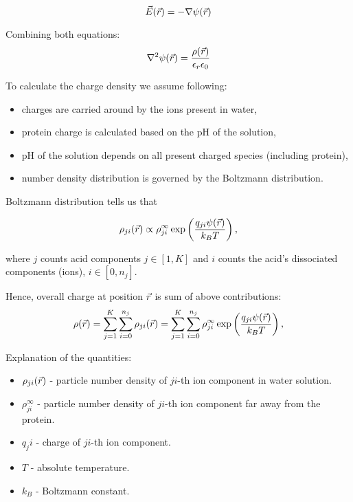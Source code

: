 \begin{equation}
    \vec{E}(\vec{r}) = -\nabla \psi(\vec{r})
\end{equation}

Combining both equations:
\begin{equation}\label{eq:PoissonInMatter1}
    \nabla^2 \psi(\vec{r}) = \frac{\rho(\vec{r})}{\epsilon_r\epsilon_0}
\end{equation}

To calculate the charge density we assume following:
\begin{itemize}
    \item charges are carried around by the ions present in water,
    \item protein charge is calculated based on the pH of the solution,
    \item pH of the solution depends on all present charged species (including protein),
    \item number density distribution is governed by the Boltzmann distribution.
\end{itemize}

Boltzmann distribution tells us that

\begin{equation}
    \rho_{ji}(\vec{r}) \propto \rho_{ji}^{\infty} \exp\left(\frac{q_{ji}\psi(\vec{r})}{k_BT}\right),
\end{equation}

where $j$ counts acid components $j \in [1, K]$ and $i$ counts the acid's dissociated components
(ions), $i \in [0, n_j]$.

Hence, overall charge at position $\vec{r}$ is sum of above contributions:
\begin{equation}\label{eq:BoltzmannDist1}
    \rho(\vec{r}) = \sum_{j = 1}^{K}\sum_{i=0}^{n_j} \rho_{ji}(\vec{r}) =
    \sum_{j = 1}^{K}\sum_{i=0}^{n_j} \rho_{ji}^{\infty} \exp\left(\frac{q_{ji}\psi(\vec{r})}{k_BT}\right),
\end{equation}

Explanation of the quantities:
\begin{itemize}
    \item $\rho_{ji}(\vec{r})$ - particle number density of $ji$-th ion component in water solution.
    \item $\rho_{ji}^{\infty}$ - particle number density of $ji$-th ion component far away from the protein.
    \item $q_ji$ - charge of $ji$-th ion component.
    \item $T$ - absolute temperature.
    \item $k_B$ - Boltzmann constant.
\end{itemize}

